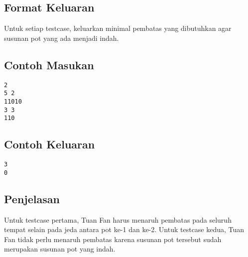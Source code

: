\documentclass{article}
\begin{document}
\subsection*{Format Keluaran}

Untuk setiap testcase, keluarkan minimal pembatas yang dibutuhkan agar susunan pot yang ada menjadi indah.
\\

\begin{multicols}{2}
\subsection*{Contoh Masukan}
\begin{lstlisting}
2
5 2
11010
3 3
110
\end{lstlisting}
\columnbreak
\subsection*{Contoh Keluaran}
\begin{lstlisting}
3
0
\end{lstlisting}
\vfill
\null
\end{multicols}

\subsection*{Penjelasan}
Untuk testcase pertama, Tuan Fan harus menaruh pembatas pada seluruh tempat selain pada jeda antara pot ke-1 dan ke-2.
Untuk testcase kedua, Tuan Fan tidak perlu menaruh pembatas karena susunan pot tersebut sudah merupakan susunan pot yang indah.

\pagebreak
\end{document}
